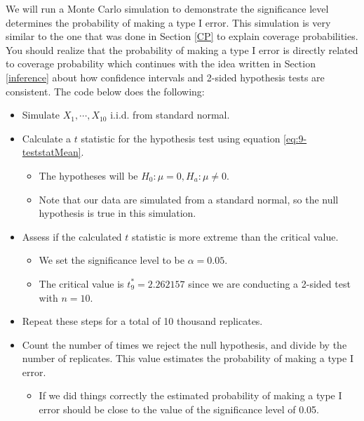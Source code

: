 \documentclass[
]{book}
\providecommand{\tightlist}{%
  \setlength{\itemsep}{0pt}\setlength{\parskip}{0pt}}
\theoremstyle{definition}
\theoremstyle{definition}
\theoremstyle{definition}
\theoremstyle{definition}
\theoremstyle{remark}
\begin{document}
We will run a Monte Carlo simulation to demonstrate the significance level determines the probability of making a type I error. This simulation is very similar to the one that was done in Section \ref{CP} to explain coverage probabilities. You should realize that the probability of making a type I error is directly related to coverage probability which continues with the idea written in Section \ref{inference} about how confidence intervals and 2-sided hypothesis tests are consistent. The code below does the following:

\begin{itemize}
\tightlist
\item
  Simulate \(X_1, \cdots, X_{10}\) i.i.d. from standard normal.
\item
  Calculate a \(t\) statistic for the hypothesis test using equation \eqref{eq:9-teststatMean}.

  \begin{itemize}
  \tightlist
  \item
    The hypotheses will be \(H_0: \mu = 0, H_a: \mu \neq 0\).
  \item
    Note that our data are simulated from a standard normal, so the null hypothesis is true in this simulation.
  \end{itemize}
\item
  Assess if the calculated \(t\) statistic is more extreme than the critical value.

  \begin{itemize}
  \tightlist
  \item
    We set the significance level to be \(\alpha = 0.05\).
  \item
    The critical value is \(t_9^* = 2.262157\) since we are conducting a 2-sided test with \(n=10\).
  \end{itemize}
\item
  Repeat these steps for a total of 10 thousand replicates.
\item
  Count the number of times we reject the null hypothesis, and divide by the number of replicates. This value estimates the probability of making a type I error.

  \begin{itemize}
  \tightlist
  \item
    If we did things correctly the estimated probability of making a type I error should be close to the value of the significance level of 0.05.
  \end{itemize}
\end{itemize}
\end{document}
